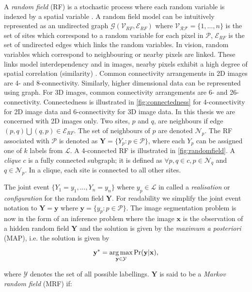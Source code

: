 A \textit{random field} (RF) is a stochastic process where each random variable is indexed by a spatial variable \citep{Adler2007,Gikhman1996}. A random field model can be intuitively represented as an undirected graph $\mathcal{G}(\mathcal{V}_{RF},\mathcal{E}_{RF})$ where $\mathcal{V_{RF}} = \{1, \ldots, n\}$ is the set of sites which correspond to a random variable for each pixel in $\mathcal{P}$, $\mathcal{E}_{RF}$ is the set of undirected edges which links the random variables. In vision, random variables which correspond to neighbouring or nearby pixels are linked. These links model interdependency and in images, nearby pixels exhibit a high degree of spatial correlation (similarity) \citep{Brett2003}. Common connectivity arrangements in 2D images are 4- and 8-connectivity. Similarly, higher dimensional data can be represented using graph. For 3D images, common connectivity arrangements are 6- and 26-connectivity. Connectedness is illustrated in \autoref{fig:connectedness} for 4-connectivity for 2D image data and 6-connectivity for 3D image data. In this thesis we are concerned with 2D images only. Two sites, $p$ and $q$, are neighbours if edge $(p,q) \bigcup (q,p) \in \mathcal{E}_{RF}$. The set of neighbours of $p$ are denoted $\mathcal{N}_p$. The RF associated with $\mathcal{P}$ is denoted as $\mathbf{Y} = \{Y_p:p \in \mathcal{P}\}$, where each $Y_p$ can be assigned one of $k$ labels from $\mathcal{L}$. A 4-connected RF is illustrated in \autoref{fig:randomfield}. A \textit{clique} $c$ is a fully connected subgraph; it is defined as $\forall p,q \in c, p \in \mathcal{N}_q$ and $q \in \mathcal{N}_p$. In a clique, each site is connected to all other sites.

The joint event $\{Y_1=y_1, \ldots, Y_n=y_n\}$ where $y_p \in \mathcal{L}$ in called a \textit{realisation} or \textit{configuration} for the random field $\mathbf{Y}$.
For readability we simplify the joint event notation to $\mathbf{Y}=\mathbf{y}$ where $\mathbf{y}=\{y_p : p \in \mathcal{P}\}$.
The image segmentation problem is now in the form of an inference problem where the image $\mathbf{x}$ is the observation of a hidden random field $\mathbf{Y}$ and the solution is given by the \textit{maximum a posteriori} (MAP), i.e. the solution is given by

\begin{equation}
	\mathbf{y^*} = \operatorname*{arg\,max}_{\mathbf{y} \in \mathcal{Y}}\Pr(\mathbf{y}|\mathbf{x}),
	\label{eq:mrfprobability}
\end{equation}

where $\mathcal{Y}$ denotes the set of all possible labellings. $\mathbf{Y}$ is said to be a \textit{Markov random field} (MRF) if:

